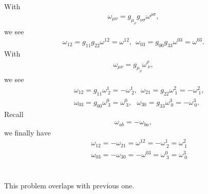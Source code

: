 \documentclass[11pt]{article}
\begin{document}
\section{ }
With
\begin{eqnarray}
    \omega_{\mu\nu} = g_{\mu_\rho}g_{\nu \sigma} \omega^{\rho\sigma},
\end{eqnarray}
we see
\begin{eqnarray}
    \omega_{12} = g_{11}g_{22} \omega^{12}=\omega^{12}, ~~\omega_{03} = g_{00}g_{33} \omega^{03}=\omega^{03}.
\end{eqnarray}
With
\begin{eqnarray}
    \omega_{\mu\nu} = g_{\mu_\rho} \omega^\rho_{~\nu},
\end{eqnarray}
we see
\begin{eqnarray}
    &&\omega_{12} = g_{11} \omega^1_{~2}=-\omega^1_{~2}, ~~\omega_{21} = g_{22} \omega^2_{~1}=-\omega^2_{~1},\\
    &&\omega_{03} = g_{00} \omega^0_{~3}=\omega^0_{~3}, ~~~\omega_{30} = g_{33} \omega^3_{~0}=-\omega^3_{~0}.
\end{eqnarray}
Recall
\begin{eqnarray}
    \omega_{ab}=-\omega_{ba},
\end{eqnarray}
we finally have
\begin{eqnarray}
   && \omega_{12}  
    = -\omega_{21}
    =  \omega^{12}
    = -\omega^1_{~2}
    =  \omega^2_{~1} \\
    && \omega_{03}     
      = -\omega_{30}
      = -\omega^{03}
      =  \omega^0_{~3}
      =  \omega^3_{~0}
\end{eqnarray}

\section{ }
This problem overlaps with previous one.
\end{document}
